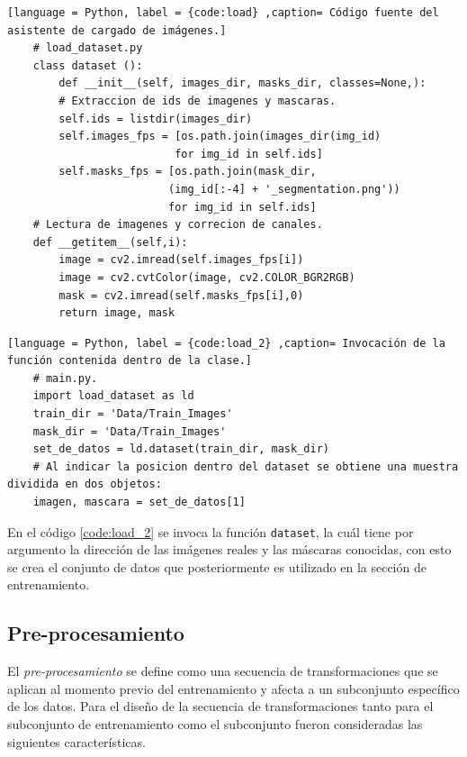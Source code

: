 \lstset{style=pystyle}

\begin{lstlisting}[language = Python, label = {code:load} ,caption= Código fuente del asistente de cargado de imágenes.]
    # load_dataset.py
    class dataset ():
        def __init__(self, images_dir, masks_dir, classes=None,):
        # Extraccion de ids de imagenes y mascaras.
        self.ids = listdir(images_dir)
        self.images_fps = [os.path.join(images_dir(img_id)
                          for img_id in self.ids]
        self.masks_fps = [os.path.join(mask_dir,
                         (img_id[:-4] + '_segmentation.png'))
                         for img_id in self.ids]
    # Lectura de imagenes y correcion de canales.
    def __getitem__(self,i):
        image = cv2.imread(self.images_fps[i])
        image = cv2.cvtColor(image, cv2.COLOR_BGR2RGB)
        mask = cv2.imread(self.masks_fps[i],0)
        return image, mask
\end{lstlisting}

\begin{lstlisting}[language = Python, label = {code:load_2} ,caption= Invocación de la función contenida dentro de la clase.]
    # main.py.
    import load_dataset as ld 
    train_dir = 'Data/Train_Images'
    mask_dir = 'Data/Train_Images'
    set_de_datos = ld.dataset(train_dir, mask_dir)
    # Al indicar la posicion dentro del dataset se obtiene una muestra dividida en dos objetos:
    imagen, mascara = set_de_datos[1]

\end{lstlisting}

En el código \ref{code:load_2} se invoca la función \texttt{dataset}, la cuál tiene por argumento la dirección de las imágenes reales y las máscaras conocidas, con esto se crea el conjunto de datos que posteriormente es utilizado en la sección de entrenamiento.


\subsection{Pre-procesamiento}
El \emph{pre-procesamiento} se define como una secuencia de transformaciones que se aplican al momento previo del entrenamiento y afecta a un subconjunto específico de los datos. Para el diseño de la secuencia de transformaciones tanto para el subconjunto de entrenamiento como el subconjunto fueron consideradas las siguientes características.

